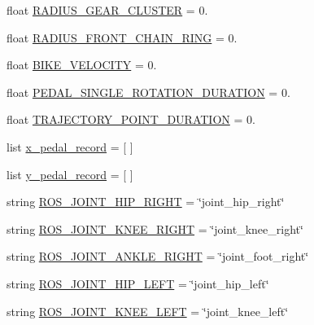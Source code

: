 \begin{DoxyCompactItemize}
\item 
float \mbox{\hyperlink{namespacepedal__simulation_ae444d2c988e8cc50de0b1ac41d5ff0fb}{R\+A\+D\+I\+U\+S\+\_\+\+G\+E\+A\+R\+\_\+\+C\+L\+U\+S\+T\+ER}} = 0.
\item 
float \mbox{\hyperlink{namespacepedal__simulation_a2643b200d9654018f7c6a9f75c8ca6b7}{R\+A\+D\+I\+U\+S\+\_\+\+F\+R\+O\+N\+T\+\_\+\+C\+H\+A\+I\+N\+\_\+\+R\+I\+NG}} = 0.
\item 
float \mbox{\hyperlink{namespacepedal__simulation_a8fb5f08f702f4a35dfbb697476d4f157}{B\+I\+K\+E\+\_\+\+V\+E\+L\+O\+C\+I\+TY}} = 0.
\item 
float \mbox{\hyperlink{namespacepedal__simulation_add194f27c65036bd1be75f23c0ff032a}{P\+E\+D\+A\+L\+\_\+\+S\+I\+N\+G\+L\+E\+\_\+\+R\+O\+T\+A\+T\+I\+O\+N\+\_\+\+D\+U\+R\+A\+T\+I\+ON}} = 0.
\item 
float \mbox{\hyperlink{namespacepedal__simulation_ad14057994c32a5c4f7ad4dc65a69a0bb}{T\+R\+A\+J\+E\+C\+T\+O\+R\+Y\+\_\+\+P\+O\+I\+N\+T\+\_\+\+D\+U\+R\+A\+T\+I\+ON}} = 0.
\item 
list \mbox{\hyperlink{namespacepedal__simulation_a85aede234b0b86c615af4f9d73a3d148}{x\+\_\+pedal\+\_\+record}} = \mbox{[} \mbox{]}
\item 
list \mbox{\hyperlink{namespacepedal__simulation_ad56ea447f391114ab2b382becbe2bc59}{y\+\_\+pedal\+\_\+record}} = \mbox{[} \mbox{]}
\item 
string \mbox{\hyperlink{namespacepedal__simulation_aa2d21a54aac1c1e059d8a17050ddfed4}{R\+O\+S\+\_\+\+J\+O\+I\+N\+T\+\_\+\+H\+I\+P\+\_\+\+R\+I\+G\+HT}} = \char`\"{}joint\+\_\+hip\+\_\+right\char`\"{}
\item 
string \mbox{\hyperlink{namespacepedal__simulation_ad8c24ef49f1c476e1ad8be5bc4d1c710}{R\+O\+S\+\_\+\+J\+O\+I\+N\+T\+\_\+\+K\+N\+E\+E\+\_\+\+R\+I\+G\+HT}} = \char`\"{}joint\+\_\+knee\+\_\+right\char`\"{}
\item 
string \mbox{\hyperlink{namespacepedal__simulation_a091f63fe58d9a41b150f5029e548f08f}{R\+O\+S\+\_\+\+J\+O\+I\+N\+T\+\_\+\+A\+N\+K\+L\+E\+\_\+\+R\+I\+G\+HT}} = \char`\"{}joint\+\_\+foot\+\_\+right\char`\"{}
\item 
string \mbox{\hyperlink{namespacepedal__simulation_a6caf046a25da8884a3feed405121b7db}{R\+O\+S\+\_\+\+J\+O\+I\+N\+T\+\_\+\+H\+I\+P\+\_\+\+L\+E\+FT}} = \char`\"{}joint\+\_\+hip\+\_\+left\char`\"{}
\item 
string \mbox{\hyperlink{namespacepedal__simulation_ada493a22ef9aa6120fb10a58db55e10d}{R\+O\+S\+\_\+\+J\+O\+I\+N\+T\+\_\+\+K\+N\+E\+E\+\_\+\+L\+E\+FT}} = \char`\"{}joint\+\_\+knee\+\_\+left\char`\"{}

\end{DoxyCompactItemize}
